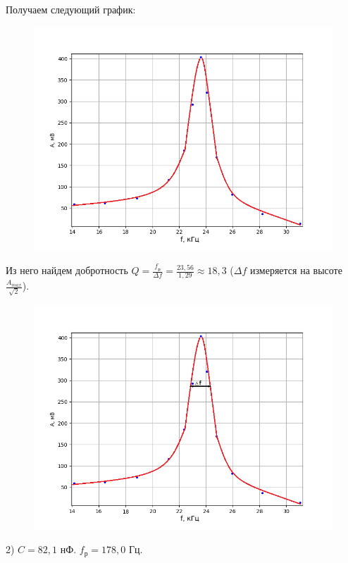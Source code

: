 \documentclass[a4paper,12pt]{article} %
\begin{document}
Получаем следующий график:

\begin{figure}[h!]
	\centering
	\includegraphics[scale=0.85]{Pictures/Рез1.png}
\end{figure}
\newpage
Из него найдем добротность $Q = \frac{f_{\text{р}}}{\Delta f} = \frac{23,56}{1,29} \approx 18,3$ ($\Delta f$ измеряется на высоте $\frac{A_{max}}{\sqrt{2}}$).

\begin{figure}[h!]
	\centering
	\includegraphics[scale=0.85]{Pictures/Рез1Добр.png}
\end{figure}

2) $C = 82,1$ нФ. $f_{\text{р}} = 178,0$ Гц.
\end{document}
